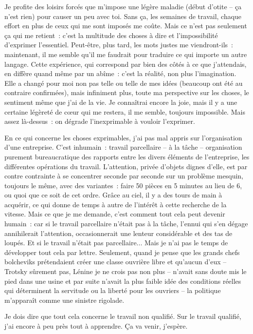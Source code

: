 \documentclass[french,twoside]{book} %
\newcommand{\salute}[1]{\bigbreak{#1}\par\medbreak}
\begin{document}
\salute{Chère Albertine,}
\noindent Je profite des loisirs forcés que m'impose une légère maladie (début d'otite – ça n'est rien) pour causer un peu avec toi. Sans ça, les semaines de travail, chaque effort en plus de ceux qui me sont imposés me coûte. Mais ce n'est pas seulement ça qui me retient : c'est la multitude des choses à dire et l'impossibilité d'exprimer l'essentiel. Peut-être, plus tard, les mots justes me viendront-ils : maintenant, il me semble qu'il me faudrait pour traduire ce qui importe un autre langage. Cette expérience, qui correspond par bien des côtés à ce que j'attendais, en diffère quand même par un abîme : c'est la réalité, non plus l'imagination. Elle a changé pour moi non pas telle ou telle de mes idées (beaucoup ont été au contraire confirmées), mais infiniment plus, toute ma perspective sur les choses, le sentiment même que j'ai de la vie. Je connaîtrai encore la joie, mais il y a une certaine légèreté de cœur qui me restera, il me semble, toujours impossible. Mais assez là-dessus : on dégrade l'inexprimable à vouloir l'exprimer.\par
En ce qui concerne les choses exprimables, j'ai pas mal appris sur l'organisation d'une entreprise. C'est inhumain : travail parcellaire – à la tâche – organisation purement bureaucratique des rapports entre les divers éléments de l'entreprise, les différentes opérations du travail. L'attention, privée d'objets dignes d'elle, est par contre contrainte à se concentrer seconde par seconde sur un problème mesquin, toujours le même, avec des variantes : faire 50 pièces en 5 minutes au lieu de 6, ou quoi que ce soit de cet ordre. Grâce au ciel, il y a des tours de main à acquérir, ce qui donne de temps à autre de l'intérêt à cette recherche de la vitesse. Mais ce que je me demande, c'est comment tout cela peut devenir humain : car si le travail parcellaire n'était pas à la tâche, l'ennui qui s'en dégage annihilerait l'attention, occasionnerait une lenteur considérable et des tas de loupés. Et si le travail n'était pas parcellaire... Mais je n'ai pas le temps de développer tout cela par lettre. Seulement, quand je pense que les grands chefs bolcheviks prétendaient créer une classe ouvrière libre et qu'aucun d'eux – Trotsky sûrement pas, Lénine je ne crois pas non plus – n'avait sans doute mis le pied dans une usine et par suite n'avait la plus faible idée des conditions réelles qui déterminent la servitude ou la liberté pour les ouvriers – la politique m'apparaît comme une sinistre rigolade.\par
Je dois dire que tout cela concerne le travail non qualifié. Sur le travail qualifié, j'ai encore à peu près tout à apprendre. Ça va venir, j'espère.\par
\end{document}
